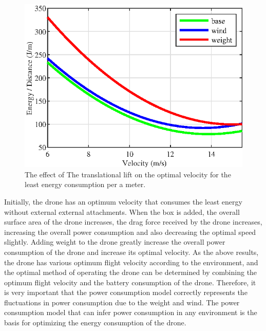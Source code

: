 \documentclass[journal]{./template/IEEEtran}
\begin{document}
\begin{figure}[ht]
\centering\includegraphics[scale=1.0]{fig10/t_lift.eps}
\caption{The effect of The translational lift on the optimal velocity for the least energy consumption per a meter.}
\label{fig: lift}
\end{figure}

Initially, the drone has an optimum velocity that consumes the least energy without external external attachments. 
When the box is added, the overall surface area of the drone increases, the drag force received by the drone increases, increasing the overall power consumption and also decreasing the optimal speed slightly. 
Adding weight to the drone greatly increase the overall power consumption of the drone and increase its optimal velocity.
As the above results, the drone has various optimum flight velocity according to the environment, and the optimal method of operating the drone can be determined by combining the optimum flight velocity and the battery consumption of the drone. 
Therefore, it is very important that the power consumption model correctly represents the fluctuations in power consumption due to the weight and wind. 
The power consumption model that can infer power consumption in any environment is the basis for optimizing the energy consumption of the drone.

\end{document}
